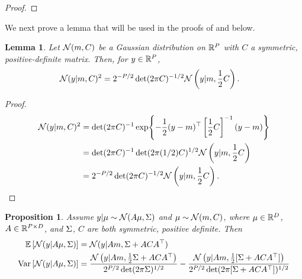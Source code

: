 \documentclass[12pt]{article}
\newtheorem{prop}{Proposition}
\newtheorem{lemma}{Lemma}
\begin{document}
\begin{proof} 
\todo
\end{proof}

We next prove a lemma that will be used in the proofs of  
and  below. 
\begin{lemma} \label{lemma:squared_Gaussian_density}
Let $\mathcal{N}(m, C)$ be a Gaussian distribution on $\mathbb{R}^{P}$ with $C$ a symmetric, positive-definite 
matrix. Then, for $y \in \mathbb{R}^{P}$, 
\begin{align*}
\mathcal{N}(y | m, C)^2 
&= 2^{-P/2} \det(2\pi C)^{-1/2} \mathcal{N}\left(y | m, \frac{1}{2}C\right). 
\end{align*}
\end{lemma}

\begin{proof}
\begin{align*}
\mathcal{N}(y | m, C)^2 
&= \det(2\pi C)^{-1} \exp\mathopen{}\left\{-\frac{1}{2} (y - m)^\top \left[\frac{1}{2}C \right]^{-1}(y - m)\right\}\mathclose{} \\
&= \det(2\pi C)^{-1} \det(2\pi (1/2)C)^{1/2} \mathcal{N}\left(y | m, \frac{1}{2}C\right) \\
&= 2^{-P/2} \det(2\pi C)^{-1/2} \mathcal{N}\left(y | m, \frac{1}{2}C\right). 
\end{align*}
\end{proof}

\begin{prop} \label{prop:Gaussian_marginal_moments}
Assume $y | \mu \sim \mathcal{N}(A \mu, \Sigma)$ and $\mu \sim \mathcal{N}(m, C)$, where $\mu \in \mathbb{R}^{D}$, 
$A \in \mathbb{R}^{P \times D}$, and $\Sigma$, $C$ are both symmetric, positive definite. Then 
\begin{align}
\mathbb{E}\left[\mathcal{N}(y | A \mu, \Sigma) \right] &= \mathcal{N}(y | Am, \Sigma + ACA^\top) \\
\mathrm{Var}\left[\mathcal{N}(y | A \mu, \Sigma) \right] 
&= \frac{\mathcal{N}\left(y | Am, \frac{1}{2} \Sigma + ACA^\top \right)}{2^{P/2} \det(2\pi \Sigma)^{1/2}} - 
\frac{\mathcal{N}\left(y | Am, \frac{1}{2}[\Sigma + ACA^\top] \right)}{2^{P/2} \det(2\pi[\Sigma + ACA^\top])^{1/2}}
\end{align}
\end{prop}
\end{document}
